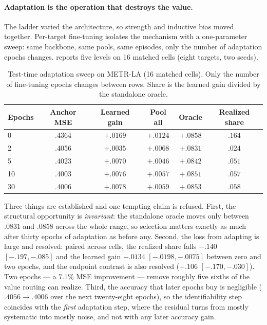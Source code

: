 \paragraph{Adaptation is the operation that destroys the value.}
The ladder varied the architecture, so strength and inductive bias moved
together. Per-target fine-tuning isolates the mechanism with a one-parameter
sweep: same backbone, same pools, same episodes, only the number of adaptation
epochs changes.  reports five levels on 16 matched cells
(eight targets, two seeds).

\begin{table}[t]
 \centering
 \small
 \caption{Test-time adaptation sweep on METR-LA (16 matched cells). Only the
 number of fine-tuning epochs changes between rows. Share is the learned gain
 divided by the standalone oracle.}
 \label{tab:adaptation}
 \begin{tabular}{lccccc}
  \toprule
  Epochs & Anchor MSE & Learned gain & Pool all & Oracle & Realized share\\
  \midrule
  0  & .4364 & $+.0169$ & $+.0124$ & $+.0858$ & $.164$\\
  2  & .4056 & $+.0035$ & $+.0068$ & $+.0831$ & $.024$\\
  5  & .4023 & $+.0070$ & $+.0046$ & $+.0842$ & $.051$\\
  10 & .4003 & $+.0076$ & $+.0057$ & $+.0851$ & $.057$\\
  30 & .4006 & $+.0078$ & $+.0059$ & $+.0853$ & $.058$\\
  \bottomrule \end{tabular}
\end{table}

Three things are established and one tempting claim is refused. First, the
structural opportunity is \emph{invariant}: the standalone oracle moves only
between $.0831$ and $.0858$ across the whole range, so selection matters
exactly as much after thirty epochs of adaptation as before any. Second, the
loss from adapting is large and resolved: paired across cells, the realized
share falls $-.140$ $[-.197,-.085]$ and the learned gain $-.0134$
$[-.0198,-.0075]$ between zero and two epochs, and the endpoint contrast is
also resolved ($-.106$ $[-.170,-.030]$). Two epochs --- a $7.1\%$ MSE
improvement --- remove roughly five sixths of the value routing can realize.
Third, the accuracy that later epochs buy is negligible ($.4056 \to .4006$ over
the next twenty-eight epochs), so the identifiability step coincides with the
\emph{first} adaptation step, where the residual turns from mostly systematic
into mostly noise, and not with any later accuracy gain.

